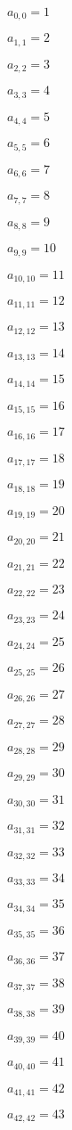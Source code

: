 \documentclass[a4paper,12pt]{article}
\begin{document}
$a _{ 0, 0 } = 1$

$a _{ 1, 1 } = 2$

$a _{ 2, 2 } = 3$

$a _{ 3, 3 } = 4$

$a _{ 4, 4 } = 5$

$a _{ 5, 5 } = 6$

$a _{ 6, 6 } = 7$

$a _{ 7, 7 } = 8$

$a _{ 8, 8 } = 9$

$a _{ 9, 9 } = 10$

$a _{ 10, 10 } = 11$

$a _{ 11, 11 } = 12$

$a _{ 12, 12 } = 13$

$a _{ 13, 13 } = 14$

$a _{ 14, 14 } = 15$

$a _{ 15, 15 } = 16$

$a _{ 16, 16 } = 17$

$a _{ 17, 17 } = 18$

$a _{ 18, 18 } = 19$

$a _{ 19, 19 } = 20$

$a _{ 20, 20 } = 21$

$a _{ 21, 21 } = 22$

$a _{ 22, 22 } = 23$

$a _{ 23, 23 } = 24$

$a _{ 24, 24 } = 25$

$a _{ 25, 25 } = 26$

$a _{ 26, 26 } = 27$

$a _{ 27, 27 } = 28$

$a _{ 28, 28 } = 29$

$a _{ 29, 29 } = 30$

$a _{ 30, 30 } = 31$

$a _{ 31, 31 } = 32$

$a _{ 32, 32 } = 33$

$a _{ 33, 33 } = 34$

$a _{ 34, 34 } = 35$

$a _{ 35, 35 } = 36$

$a _{ 36, 36 } = 37$

$a _{ 37, 37 } = 38$

$a _{ 38, 38 } = 39$

$a _{ 39, 39 } = 40$

$a _{ 40, 40 } = 41$

$a _{ 41, 41 } = 42$

$a _{ 42, 42 } = 43$
\end{document}
